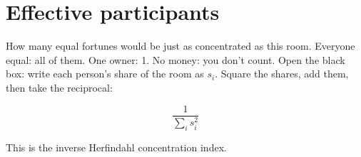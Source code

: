 \section{Effective participants}

How many equal fortunes would be just as concentrated as this room.
Everyone equal: all of them. One owner: 1. No money: you don't count.
Open the black box: write each person's share of the room as $s_i$. Square the shares, add them, then take the reciprocal:

\[ \frac{1}{\sum_i s_i^2} \]

This is the inverse Herfindahl concentration index.

\begin{figure}
\end{figure}

